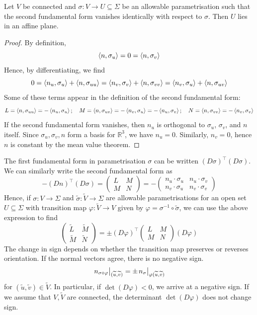 \documentclass[a4paper]{article}
\begin{document}
\begin{lemma}
	Let \( V \) be connected and \( \sigma \colon V \to U \subseteq \Sigma \) be an allowable parametrisation such that the second fundamental form vanishes identically with respect to \( \sigma \).
	Then \( U \) lies in an affine plane.
\end{lemma}
\begin{proof}
	By definition,
	\[
		\left\langle{n,\sigma_u}\right\rangle = 0 = \left\langle{n,\sigma_v}\right\rangle
	\]
	Hence, by differentiating, we find
	\[
		0 = \left\langle{n_u, \sigma_u}\right\rangle + \left\langle{n, \sigma_{uu}}\right\rangle = \left\langle{n_v, \sigma_v}\right\rangle + \left\langle{n, \sigma_{vv}}\right\rangle = \left\langle{n_v, \sigma_u}\right\rangle + \left\langle{n,\sigma_{uv}}\right\rangle
	\]
	Some of these terms appear in the definition of the second fundamental form:
	\[
		L = \left\langle{n,\sigma_{uu}}\right\rangle = -\left\langle{n_u, \sigma_u}\right\rangle;\quad M = \left\langle{n,\sigma_{uv}}\right\rangle = -\left\langle{n_v, \sigma_u}\right\rangle = -\left\langle{n_u, \sigma_v}\right\rangle;\quad N = \left\langle{n,\sigma_{vv}}\right\rangle = -\left\langle{n_v, \sigma_v}\right\rangle
	\]
	If the second fundamental form vanishes, then \( n_u \) is orthogonal to \( \sigma_u \), \( \sigma_v \), and \( n \) itself.
	Since \( \sigma_u, \sigma_v, n \) form a basis for \( \mathbb R^3 \), we have \( n_u = 0 \).
	Similarly, \( n_v = 0 \), hence \( n \) is constant by the mean value theorem.
\end{proof}

\begin{remark}
	The first fundamental form in parametrisation \( \sigma \) can be written \( (D \sigma)^\top (D \sigma) \).
	We can similarly write the second fundamental form as
	\[
		-(Dn)^\top (D\sigma) = \begin{pmatrix}
			L & M \\
			M & N
		\end{pmatrix} = -\begin{pmatrix}
			n_u \cdot \sigma_u & n_u \cdot \sigma_v \\
			n_v \cdot \sigma_u & n_v \cdot \sigma_v
		\end{pmatrix}
	\]
	Hence, if \( \sigma \colon V \to \Sigma \) and \( \widetilde \sigma \colon \widetilde V \to \Sigma \) are allowable parametrisations for an open set \( U \subseteq \Sigma \) with transition map \( \varphi \colon \widetilde V \to V \) given by \( \varphi = \sigma^{-1} \circ \widetilde \sigma \), we can use the above expression to find
	\[
		\begin{pmatrix}
			\widetilde L & \widetilde M \\
			\widetilde M & \widetilde N
		\end{pmatrix} = \pm (D\varphi)^\top \begin{pmatrix}
			L & M \\
			M & N
		\end{pmatrix} (D\varphi)
	\]
	The change in sign depends on whether the transition map preserves or reverses orientation.
	If the normal vectors agree, there is no negative sign.
	\[
		\teval{n_{\sigma \circ \varphi}}{(\widetilde u, \widetilde v)} = \pm \teval{n_\sigma}{\varphi(\widetilde u, \widetilde v)}
	\]
	for \( (\widetilde u, \widetilde v) \in \widetilde V \).
	In particular, if \( \det (D \varphi) < 0 \), we arrive at a negative sign.
	If we assume that \( V, \widetilde V \) are connected, the determinant \( \det (D \varphi) \) does not change sign.
\end{remark}
\end{document}
